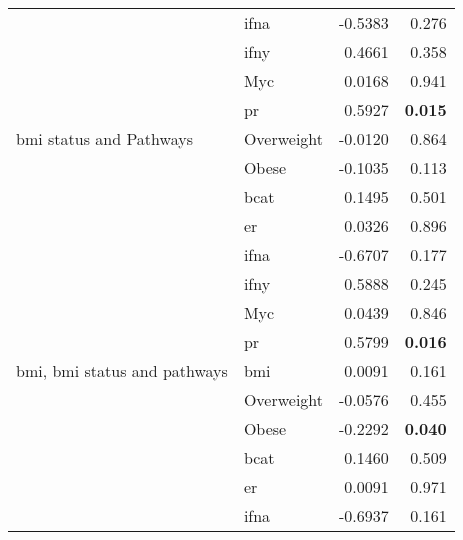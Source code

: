\begin{table}[htpb]
\begin{threeparttable}
\begin{tabular}{llrr}
                                                                       & \gls{ifna} & -0.5383 & 0.276\\
                                                                       & \gls{ifny} & 0.4661  & 0.358\\
                                                                       & Myc        & 0.0168  & 0.941\\
                                                                       & \gls{pr}   & 0.5927  & \textbf{0.015}\\
			\hline
			\rule{0pt}{2.25ex}\gls{bmi} status and Pathways            & Overweight & -0.0120 & 0.864\\
                                                                       & Obese      & -0.1035 & 0.113\\
                                                                       & \gls{bcat} & 0.1495  & 0.501\\
                                                                       & \gls{er}   & 0.0326  & 0.896\\
                                                                       & \gls{ifna} & -0.6707 & 0.177\\
                                                                       & \gls{ifny} & 0.5888  & 0.245\\
                                                                       & Myc        & 0.0439  & 0.846\\
                                                                       & \gls{pr}   & 0.5799  & \textbf{0.016}\\
			\hline
			\rule{0pt}{2.25ex}\gls{bmi}, \gls{bmi} status and pathways & \gls{bmi}  & 0.0091  & 0.161\\
                                                                       & Overweight & -0.0576 & 0.455\\
                                                                       & Obese      & -0.2292 & \textbf{0.040}\\
                                                                       & \gls{bcat} & 0.1460  & 0.509\\
                                                                       & \gls{er}   & 0.0091  & 0.971\\
                                                                       & \gls{ifna} & -0.6937 & 0.161\\

\end{tabular}
\end{threeparttable}
\end{table}
